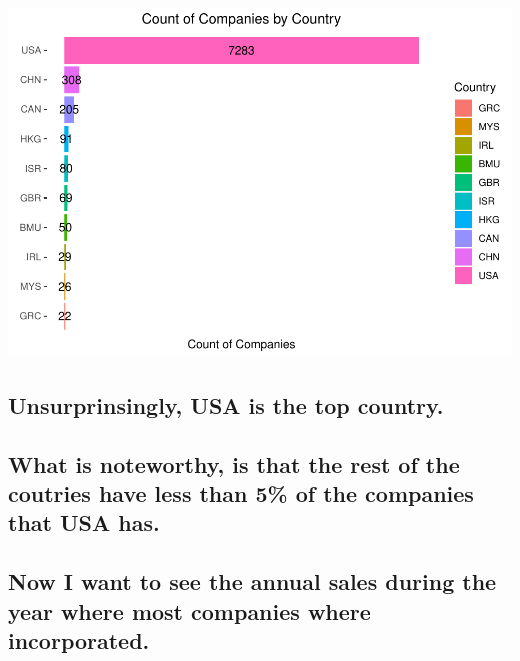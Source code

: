 \documentclass[]{article}
\begin{document}
\includegraphics{Main_files/figure-latex/unnamed-chunk-15-1.pdf}

\hypertarget{unsurprinsingly-usa-is-the-top-country.}{%
\subsection{Unsurprinsingly, USA is the top
country.}\label{unsurprinsingly-usa-is-the-top-country.}}

\hypertarget{what-is-noteworthy-is-that-the-rest-of-the-coutries-have-less-than-5-of-the-companies-that-usa-has.}{%
\subsection{What is noteworthy, is that the rest of the coutries have
less than 5\% of the companies that USA
has.}\label{what-is-noteworthy-is-that-the-rest-of-the-coutries-have-less-than-5-of-the-companies-that-usa-has.}}

\hypertarget{now-i-want-to-see-the-annual-sales-during-the-year-where-most-companies-where-incorporated.}{%
\subsection{Now I want to see the annual sales during the year where
most companies where
incorporated.}\label{now-i-want-to-see-the-annual-sales-during-the-year-where-most-companies-where-incorporated.}}
\end{document}
